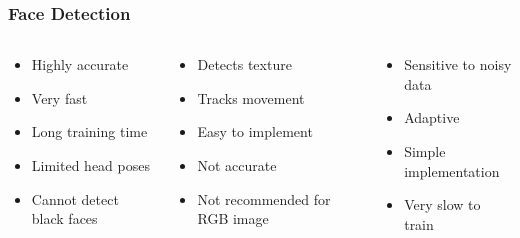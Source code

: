 \documentclass[aspectratio=149]{beamer}
\begin{document}
\begin{frame}
\frametitle{Face Detection}
\begin{columns}
	\begin{column}{.35\textwidth}
		\begin{itemize}
			\item Highly accurate
			\item Very fast
			\item Long training time
			\item Limited head poses
			\item Cannot detect black faces
		\end{itemize}
	\end{column}
	\begin{column}{.35\textwidth}
		\begin{itemize}
			\item Detects texture
			\item Tracks movement 
			\item Easy to implement
			\item Not accurate
			\item Not recommended for RGB image		
		\end{itemize}
	\end{column}
	\begin{column}{.35\textwidth}
		\begin{itemize}
			\item Sensitive to noisy data
			\item Adaptive
			\item Simple implementation
			\item Very slow to train		
		\end{itemize}
	\end{column}
\end{columns} 

\end{frame}

\end{document}
